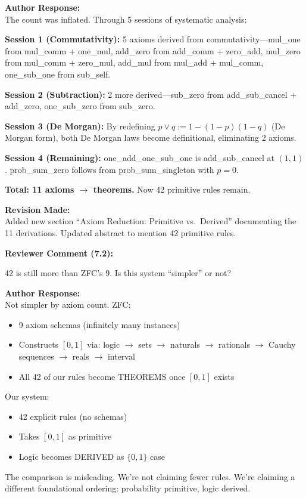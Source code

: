 \documentclass[11pt,a4paper]{article}
\newenvironment{review}[1]{%
    \begin{leftbar}
    \textcolor{reviewcolor}{\textbf{Reviewer Comment (#1):}}\\[0.5em]
    \itshape
}{%
    \end{leftbar}
}
\newenvironment{response}{%
    \textcolor{responsecolor}{\textbf{Author Response:}}\\[0.5em]
}{%
    \vspace{1em}
}
\newenvironment{revision}{%
    \textcolor{revisioncolor}{\textbf{Revision Made:}}\\[0.5em]
}{%
    \vspace{1em}
}
\begin{document}
\begin{response}
The count was inflated. Through 5 sessions of systematic analysis:

\textbf{Session 1 (Commutativity):} 5 axioms derived from commutativity---mul\_one from mul\_comm + one\_mul, add\_zero from add\_comm + zero\_add, mul\_zero from mul\_comm + zero\_mul, add\_mul from mul\_add + mul\_comm, one\_sub\_one from sub\_self.

\textbf{Session 2 (Subtraction):} 2 more derived---sub\_zero from add\_sub\_cancel + add\_zero, one\_sub\_zero from sub\_zero.

\textbf{Session 3 (De Morgan):} By redefining $p \vee q := 1 - (1-p)(1-q)$ (De Morgan form), both De Morgan laws become definitional, eliminating 2 axioms.

\textbf{Session 4 (Remaining):} one\_add\_one\_sub\_one is add\_sub\_cancel at $(1,1)$. prob\_sum\_zero follows from prob\_sum\_singleton with $p=0$.

\textbf{Total: 11 axioms $\to$ theorems.} Now 42 primitive rules remain.
\end{response}

\begin{revision}
Added new section ``Axiom Reduction: Primitive vs.\ Derived'' documenting the 11 derivations. Updated abstract to mention 42 primitive rules.
\end{revision}

\begin{review}{7.2}
42 is still more than ZFC's 9. Is this system ``simpler'' or not?
\end{review}

\begin{response}
Not simpler by axiom count. ZFC:
\begin{itemize}
    \item 9 axiom schemas (infinitely many instances)
    \item Constructs $[0,1]$ via: logic $\to$ sets $\to$ naturals $\to$ rationals $\to$ Cauchy sequences $\to$ reals $\to$ interval
    \item All 42 of our rules become THEOREMS once $[0,1]$ exists
\end{itemize}

Our system:
\begin{itemize}
    \item 42 explicit rules (no schemas)
    \item Takes $[0,1]$ as primitive
    \item Logic becomes DERIVED as $\{0,1\}$ case
\end{itemize}

The comparison is misleading. We're not claiming fewer rules. We're claiming a different foundational ordering: probability primitive, logic derived.
\end{response}
\end{document}
